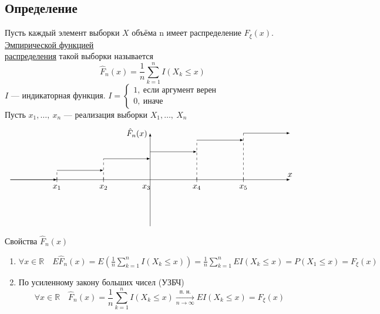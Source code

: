 \documentclass[12pt, a4paper]{article}
\begin{document}
\subsection*{Определение}
Пусть каждый элемент выборки $X$ объёма n имеет распределение $F_{\xi}(x)$. \underline{Эмпирической функцией}\\ \underline{распределения} такой выборки называется
\[\hat{F}_n(x) = \frac{1}{n} \sum_{k = 1}^{n} I(X_k\leq x)\]
$I$ --- индикаторная функция. $I = \begin{cases}
    1,\ \text{если аргумент верен}\\
    0,\ \text{иначе}
\end{cases}$\\
Пусть $x_1,\dots,\ x_n$ --- реализация выборки $X_1,\dots,\ X_n$\\
\[
\begin{tikzpicture}[scale=2, >=latex]
    \draw[->, >=latex] (0, -1) -- (0, 1) node(0)[anchor = east]{$\hat{F}_n(x)$};
    \draw (-2, -0.05) node(1)[anchor=north]{$x_1$} -- (-2, 0.05);
    \draw (-1, -0.05) node(2)[anchor=north]{$x_2$}-- (-1, 0.05);
    \draw (0.07, -0.05) node(3)[anchor=north east]{$x_3$}-- (0.07, -0.05);
    \draw (1, -0.05) node(4)[anchor=north]{$x_4$}-- (1, 0.05);
    \draw (2, -0.05) node(5)[anchor=north]{$x_5$}-- (2, 0.05);
    \draw[->] (-3, 0) -- (-2, 0);
    \draw[->] (-2, 0.2) -- (-1, 0.2);
    \draw[dashed] (-2, 0) -- (-2, 0.2);
    \draw[->] (-1, 0.45) -- (0, 0.45);
    \draw[dashed] (-1, 0) -- (-1, 0.45);
    \draw[->] (0, 0.6) -- (1, 0.6);
    \draw[dashed] (1, 0) -- (1, 0.85);
    \draw[->] (1, 0.85) -- (2, 0.85);
    \draw[dashed] (2, 0) -- (2, 1);
    \draw[->] (2, 1) -- (3, 1);
    \draw[->] (-3, 0) -- (3, 0) node(2)[anchor = south]{$x$};
\end{tikzpicture}
\]
\begin{center}
    Свойства $\hat{F}_n(x)$
\end{center}
\begin{enumerate}
    \item $\displaystyle\forall x\in\mathbb{R}\quad E\hat{F}_n(x) = E\left(\frac{1}{n} \sum_{k = 1}^{n} I(X_k \leq x)\right) = \frac{1}{n} \sum_{k = 1}^{n} EI(X_k \leq x) = P(X_1 \leq x) = F_{\xi}(x)$
    \item По усиленному закону больших чисел (УЗБЧ)
    \[\forall x\in \mathbb{R}\quad \hat{F}_n(x) = \frac{1}{n} \sum_{k = 1}^{n} I(X_k \leq x) \xrightarrow[n\to\infty]{\text{п. н.}} EI(X_k \leq x) = F_{\xi}(x)\]
\end{enumerate}
\end{document}
